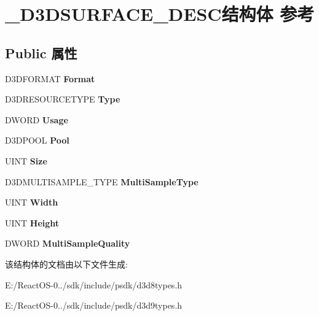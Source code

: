 \hypertarget{struct___d3_d_s_u_r_f_a_c_e___d_e_s_c}{}\section{\+\_\+\+D3\+D\+S\+U\+R\+F\+A\+C\+E\+\_\+\+D\+E\+S\+C结构体 参考}
\label{struct___d3_d_s_u_r_f_a_c_e___d_e_s_c}
\subsection*{Public 属性}
\begin{DoxyCompactItemize}
\item 
\mbox{\label{struct___d3_d_s_u_r_f_a_c_e___d_e_s_c_a8d98dff02215c5249b7732d34f8462fa}} 
D3\+D\+F\+O\+R\+M\+AT {\bfseries Format}
\item 
\mbox{\label{struct___d3_d_s_u_r_f_a_c_e___d_e_s_c_a6c43eae5ed1a6f0d4969c92b332a67c9}} 
D3\+D\+R\+E\+S\+O\+U\+R\+C\+E\+T\+Y\+PE {\bfseries Type}
\item 
\mbox{\label{struct___d3_d_s_u_r_f_a_c_e___d_e_s_c_a0afc45fb242221b310de1c35e0310f22}} 
D\+W\+O\+RD {\bfseries Usage}
\item 
\mbox{\label{struct___d3_d_s_u_r_f_a_c_e___d_e_s_c_adfb5aa84de097af5dd29a838ed5c3bd5}} 
D3\+D\+P\+O\+OL {\bfseries Pool}
\item 
\mbox{\label{struct___d3_d_s_u_r_f_a_c_e___d_e_s_c_a3150ff88679645191fa56708014e6c0f}} 
U\+I\+NT {\bfseries Size}
\item 
\mbox{\label{struct___d3_d_s_u_r_f_a_c_e___d_e_s_c_ae83daf51d1be0d99b4a574aed5562049}} 
D3\+D\+M\+U\+L\+T\+I\+S\+A\+M\+P\+L\+E\+\_\+\+T\+Y\+PE {\bfseries Multi\+Sample\+Type}
\item 
\mbox{\label{struct___d3_d_s_u_r_f_a_c_e___d_e_s_c_ab2c50a21ec43b97bab0a9d2bcff9c895}} 
U\+I\+NT {\bfseries Width}
\item 
\mbox{\label{struct___d3_d_s_u_r_f_a_c_e___d_e_s_c_a0cc0c698f2acebe55607d5099358bd2b}} 
U\+I\+NT {\bfseries Height}
\item 
\mbox{\label{struct___d3_d_s_u_r_f_a_c_e___d_e_s_c_a8ea8b1fa50afc465c9a5e6f2f0e8c28f}} 
D\+W\+O\+RD {\bfseries Multi\+Sample\+Quality}
\end{DoxyCompactItemize}


该结构体的文档由以下文件生成\+:\begin{DoxyCompactItemize}
\item 
E\+:/\+React\+O\+S-\/0../sdk/include/psdk/d3d8types.\+h\item 
E\+:/\+React\+O\+S-\/0../sdk/include/psdk/d3d9types.\+h\end{DoxyCompactItemize}
